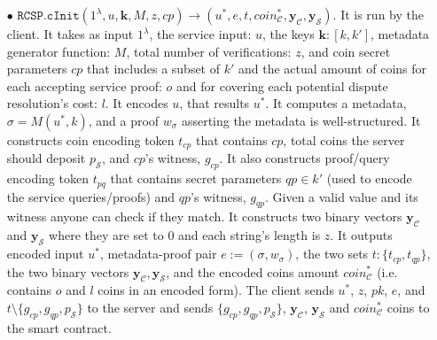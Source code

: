\begin{definition}[RC-S-P Scheme]
\begin{itemize}
\item[$\bullet$] $\mathtt{RCSP}.\mathtt{cInit}(1^{\scriptscriptstyle\lambda}, u,\bm{k}, M,z,cp)\rightarrow (u^{\scriptscriptstyle *},e,t,coin^{\scriptscriptstyle*}_{\scriptscriptstyle\mathcal C}, \bm{y}_{\scriptscriptstyle \mathcal  C},\bm{y}_{\scriptscriptstyle \mathcal  S})$. It is run by the client. It takes as input $1^{\scriptscriptstyle\lambda}$,  the service input: $u$,  the keys  $\bm{k}:[k, k']$,  metadata generator function: $M$, total number of verifications: $z$, and coin secret parameters $cp$ that includes a subset of  $k'$ and the actual amount of coins for each accepting service proof: $o$ and  for covering each potential dispute resolution's cost: $l$.  It encodes $u$, that results $u^{\scriptscriptstyle *}$.  It computes a metadata, $\sigma=M(u^{\scriptscriptstyle *},k)$, and a  proof $w_{\scriptscriptstyle\sigma}$ asserting the metadata is well-structured.  It constructs coin encoding token $t_{\scriptscriptstyle cp}$ that contains   $cp$, total coins the server should deposit $p_{\scriptscriptstyle\mathcal S}$, and   $cp$'s witness, $g_{\scriptscriptstyle cp}$.  It also constructs proof/query encoding token $t_{\scriptscriptstyle pq}$ that contains  secret  parameters $qp\in k'$ (used to encode the service queries/proofs)  and     $qp$'s witness,  $g_{\scriptscriptstyle qp}$.   Given a valid value and its witness  anyone can check if they match. It constructs two binary vectors $\bm{y}_{\scriptscriptstyle \mathcal  C}$ and $\bm{y}_{\scriptscriptstyle \mathcal  S}$ where they are set to $0$ and each string's length is $z$.  It outputs encoded input $u^{\scriptscriptstyle *}$, metadata-proof pair $e:=(\sigma,w_{\scriptscriptstyle\sigma})$, the two sets $t:\{t_{\scriptscriptstyle cp},t_{\scriptscriptstyle qp}\}$, the two binary vectors $\bm{y}_{\scriptscriptstyle \mathcal  C}, \bm{y}_{\scriptscriptstyle \mathcal  S}$, and  the encoded coins amount  $coin^{\scriptscriptstyle*}_{\scriptscriptstyle\mathcal C}$ (i.e. contains $o$ and $l$ coins in an encoded form). The client sends  $u^{\scriptscriptstyle *}$, $z$, $pk$, $e$, and $t \setminus  \{g_{\scriptscriptstyle cp},g_{\scriptscriptstyle qp},p_{\scriptscriptstyle\mathcal S}\}$ to the server and  sends $\{g_{\scriptscriptstyle cp},  g_{\scriptscriptstyle qp},p_{\scriptscriptstyle\mathcal S}\}$, $\bm{y}_{\scriptscriptstyle \mathcal  C}$, $\bm{y}_{\scriptscriptstyle \mathcal  S}$  and $coin^{\scriptscriptstyle*}_{\scriptscriptstyle\mathcal C}$ coins to the smart contract. 

\end{itemize}
\end{definition}
